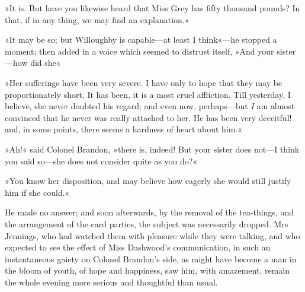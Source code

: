 »It is. But have you likewise heard that Miss Grey has fifty thousand pounds? In that, if in any thing, we may find an explanation.«

»It may be so; but Willoughby is capable—at least I think«—he stopped a moment; then added in a voice which seemed to distrust itself, »And your sister—how did she\longdash«

»Her sufferings have been very severe. I have only to hope that they may be proportionately short. It has been, it is a most cruel affliction. Till yesterday, I believe, she never doubted his regard; and even now, perhaps—but \textit{I} am almost convinced that he never was really attached to her. He has been very deceitful! and, in some points, there seems a hardness of heart about him.«

»Ah!« said Colonel Brandon, »there is, indeed! But your sister does not—I think you said so—she does not consider quite as you do?«

»You know her disposition, and may believe how eagerly she would still justify him if she could.«

He made no answer; and soon afterwards, by the removal of the tea-things, and the arrangement of the card parties, the subject was necessarily dropped. Mrs Jennings, who had watched them with pleasure while they were talking, and who expected to see the effect of Miss Dashwood’s communication, in such an instantaneous gaiety on Colonel Brandon’s side, as might have become a man in the bloom of youth, of hope and happiness, saw him, with amazement, remain the whole evening more serious and thoughtful than usual.
